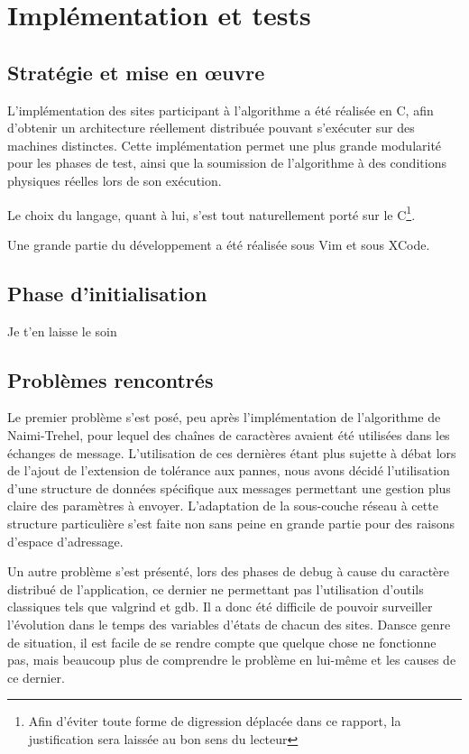 
\chapter{Implémentation et tests}\label{implementation}

\section{Stratégie et mise en \oe uvre}

L'implémentation des sites participant à l'algorithme a été réalisée en C, afin d'obtenir un
architecture réellement distribuée pouvant s'exécuter sur des machines distinctes. Cette
implémentation permet une plus grande modularité pour les phases de test, ainsi que la soumission de
l'algorithme à des conditions physiques réelles lors de son exécution.

Le choix du langage, quant à lui, s'est tout naturellement porté sur le C\footnote{Afin d'éviter
	toute forme de digression déplacée dans ce rapport, la justification sera laissée au bon sens du
lecteur}. 

Une grande partie du développement a été réalisée sous Vim et sous XCode.

\section{Phase d'initialisation}

Je t'en laisse le soin

\section{Problèmes rencontrés}

Le premier problème s'est posé, peu après l'implémentation de l'algorithme de Naimi-Trehel, pour
lequel des chaînes de caractères avaient été utilisées dans les échanges de message. L'utilisation
de ces dernières étant plus sujette à débat lors de l'ajout de l'extension de tolérance aux pannes,
nous avons décidé l'utilisation d'une structure de données spécifique aux messages permettant une
gestion plus claire des paramètres à envoyer. L'adaptation de la sous-couche réseau à cette
structure particulière s'est faite non sans peine en grande partie pour des raisons d'espace
d'adressage.

Un autre problème s'est présenté, lors des phases de debug à cause du caractère distribué de
l'application, ce dernier ne permettant pas l'utilisation d'outils classiques tels que valgrind et
gdb. Il a donc été difficile de pouvoir surveiller l'évolution dans le temps des variables d'états
de chacun des sites. Dansce genre de situation, il est facile de se rendre compte que quelque chose
ne fonctionne pas, mais beaucoup plus de comprendre le problème en lui-même et les causes de ce
dernier. 
